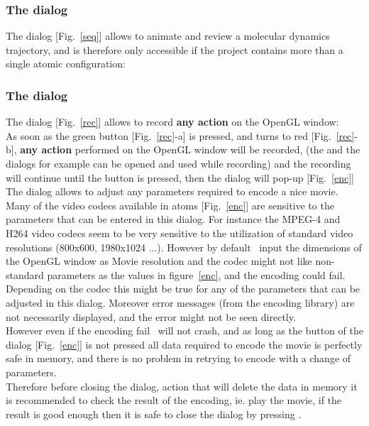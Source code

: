 \clearpage

\subsubsection*{The  dialog}

The  dialog [Fig.~\ref{seq}] allows to animate and review a molecular dynamics trajectory, 
and is therefore only accessible if the project contains more than a single atomic configuration: 

\subsubsection*{The  dialog}
\label{rdw}

The  dialog [Fig.~\ref{rec}] allows to record {\bf{any action}} on the OpenGL window:\\
\recfig
\laf As soon as the green  button [Fig.~\ref{rec}-a] is pressed, and turns to red [Fig.~\ref{rec}-b], {\bf{any action}} performed on the OpenGL window will be recorded, 
(the  and the  dialogs for example can be opened and used while recording) and the recording will continue until the  button is pressed,
then the  dialog will pop-up [Fig.~\ref{enc}]
\clearpage
{}
\noindent The  dialog allows to adjust any parameters required to encode a nice movie. \\
Many of the video codecs available in atoms [Fig.~\ref{enc}] are sensitive to the parameters that can be entered in this dialog. 
For instance the MPEG-4 and H264 video codecs seem to be very sensitive to the utilization of standard video resolutions (800x600, 1980x1024 ...).
However by default \atomes\ input the dimensions of the OpenGL window as Movie resolution and the codec might not like non-standard parameters 
as the values in figure~\ref{enc}, and the encoding could fail. \\
Depending on the codec this might be true for any of the parameters that can be adjusted in this dialog. 
Moreover error messages (from the encoding library) are not necessarily displayed, and the error might not be seen directly. \\
However even if the encoding fail \atomes\ will not crash, and as long as the  button of the dialog [Fig.~\ref{enc}] is not pressed
all data required to encode the movie is perfectly safe in memory, and there is no problem in retrying to encode with a change of parameters. \\
Therefore before closing the  dialog, action that will delete the data in memory it is recommended to check the result of the encoding, ie. play the movie,
if the result is good enough then it is safe to close the dialog by pressing .

